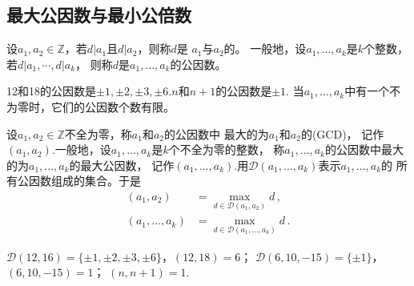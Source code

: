 \subsection{最大公因数与最小公倍数}\label{sub:最大公因数与最小公倍数}
\begin{definition}
    设$a_1,a_2\in\mathbb{Z}$，若$d|a_1$且$d|a_2$，则称$d$是
    $a_1$与$a_2$的。
    一般地，设$a_1,\ldots,a_k$是$k$个整数，若$d|a_1,\cdots,d|a_k$，
    则称$d$是$a_1,\ldots,a_k$的公因数。
\end{definition}
\begin{example}
    12和18的公因数是$\pm1,\pm2,\pm3,\pm6$.$n$和$n+1$的公因数是$\pm1$.
    当$a_1,\ldots,a_k$中有一个不为零时，它们的公因数个数有限。
\end{example}
\begin{definition}
    设$a_1,a_2\in\mathbb{Z}$不全为零，称$a_1$和$a_2$的公因数中
    最大的为$a_1$和$a_2$的(GCD)，
    记作$(a_1,a_2)$.一般地，设$a_1,\ldots,a_k$是$k$个不全为零的整数，
    称$a_1,\ldots,a_k$的公因数中最大的为$a_1,\ldots,a_k$的最大公因数，
    记作$(a_1,\ldots,a_k)$.用$\mathcal{D}(a_1,\ldots,a_k)$表示$a_1,\ldots,a_k$的
    所有公因数组成的集合。于是
    \begin{align}
        (a_1,a_2)        & =\max\limits_{d\in\mathcal{D}(a_1,a_2)}{d}\, ,        \\
        (a_1,\ldots,a_k) & =\max\limits_{d\in\mathcal{D}(a_1,\ldots,a_k)}{d}\, .
    \end{align}
\end{definition}
\begin{example}
    $\mathcal{D}(12,16)=\{\pm1,\pm2,\pm3,\pm6\}$，$(12,18)=6$；
    $\mathcal{D}(6,10,-15)=\{\pm1\}$，$(6,10,-15)=1$；
    $(n,n+1)=1$.
\end{example}
